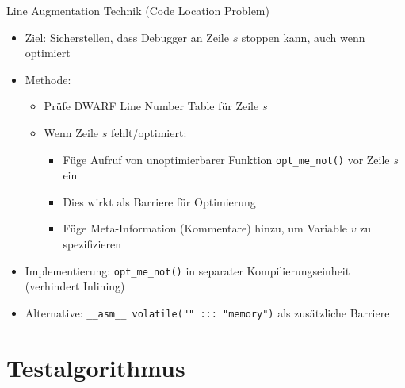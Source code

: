 ﻿\documentclass{beamer}
\begin{document}
\begin{frame}{Line Augmentation Technik (Code Location Problem)}
  \begin{itemize}
    \item Ziel: Sicherstellen, dass Debugger an Zeile $s$ stoppen kann, auch wenn optimiert
    \item Methode:
      \begin{itemize}
        \item Pr\"ufe DWARF Line Number Table f\"ur Zeile $s$
        \item Wenn Zeile $s$ fehlt/optimiert:
          \begin{itemize}
            \item F\"uge Aufruf von unoptimierbarer Funktion \texttt{opt\_me\_not()} vor Zeile $s$ ein
            \item Dies wirkt als Barriere f\"ur Optimierung
            \item F\"uge Meta-Information (Kommentare) hinzu, um Variable $v$ zu spezifizieren
          \end{itemize}
      \end{itemize}
    \item Implementierung: \texttt{opt\_me\_not()} in separater Kompilierungseinheit (verhindert Inlining)
    \item Alternative: \texttt{\_\_asm\_\_ volatile("" ::: "memory")} als zus\"atzliche Barriere
  \end{itemize}
\end{frame}

\section{Testalgorithmus}
\end{document}
